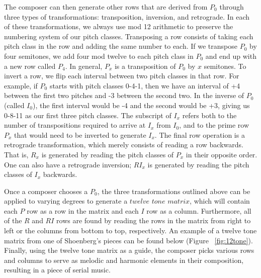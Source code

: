 The composer can then generate other rows that are derived from $P_0$ through three types of transformations:
transposition, inversion, and retrograde. In each of these transformations, we always use mod 12 arithmetic to preserve the 
numbering system of our pitch classes. Transposing a row consists of taking each pitch class in the row and adding the same number 
to each. If we transpose $P_0$ by four semitones, we add four mod twelve to each pitch class in $P_0$ and end up with a new row 
called $P_4$. In general, $P_x$ is a transposition of $P_0$ by $x$ semitones. To invert a row, we flip each interval between two 
pitch classes in that row. For example, if $P_0$ starts with pitch classes 0-4-1, then we have an interval of +4 between the first two 
pitches and -3 between the second two. In the inverse of $P_0$ (called $I_0$), the first interval would be -4 and the second would 
be +3, giving us 0-8-11 as our first three pitch classes. The subscript of $I_x$  refers both to the number of transpositions required 
to arrive at $I_x$ from $I_0$, and to the prime row $P_x$ that would need to be inverted to generate $I_x$. The final row 
operation is a retrograde transformation, which merely consists of reading a row backwards. That is, $R_x$ is generated by reading 
the pitch classes of $P_x$ in their opposite order. One can also have a retrograde inversion; $RI_x$ is generated by reading the 
pitch classes of $I_x$ backwards.

Once a composer chooses a $P_0$, the three transformations outlined above can be applied to varying degrees to generate a $twelve$ $tone$ $matrix$, which will contain each $P$ row as a row in the matrix and each $I$ row as a column.
Furthermore, all of the $R$ and $RI$ rows are found by reading the rows in the matrix from right to left or the columns 
from bottom to top, respectively. An example of a 
twelve tone matrix from one of Shoenberg's pieces can be found below (Figure ~\ref{fig:12tone}). Finally, using the twelve tone matrix as a guide,
	   the composer picks various rows and columns to serve as melodic and harmonic elements in their composition, resulting in a piece
	   of serial music.

